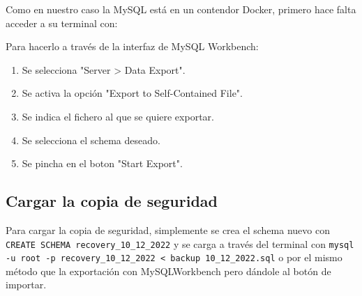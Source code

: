 \documentclass[a4paper, 11pt, oneside]{article} %
\begin{document}

Como en nuestro caso la MySQL está en un contendor Docker, primero hace falta acceder a su terminal con:


Para hacerlo a través de la interfaz de MySQL Workbench:

\begin{enumerate}
	\item Se selecciona "Server > Data Export".
	\item Se activa la opción "Export to Self-Contained File".
	\item Se indica el fichero al que se quiere exportar.
	\item Se selecciona el schema deseado.
	\item Se pincha en el boton "Start Export".
\end{enumerate}

\subsection{Cargar la copia de seguridad}

Para cargar la copia de seguridad, simplemente se crea el schema nuevo con \texttt{CREATE SCHEMA recovery_10_12_2022} y se carga a través del terminal con \texttt{mysql -u root -p recovery_10_12_2022 < backup 10_12_2022.sql} o por el mismo método que la exportación con MySQLWorkbench pero dándole al botón de importar.
\end{document}

